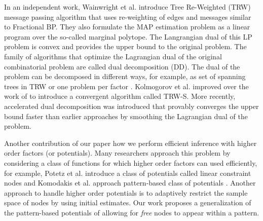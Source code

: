 \documentclass[letterpaper, 10 pt, conference]{ieeeconf} %
\begin{document}
In an 
independent work, Wainwright et al.  \cite{wainwright2005map} introduce Tree 
Re-Weighted (TRW) message passing algorithm that uses re-weighting of edges and 
messages similar to Fractional BP. They also formulate the MAP estimation 
problem as a linear program over the so-called marginal polytope.  The 
Langrangian dual of this LP problem is convex and provides the upper bound to 
the original problem. The family of algorithms that optimize the Lagrangian dual 
of the original combinatorial problem are called dual decomposition (DD). The 
dual of the problem can be decomposed in different ways, for example, as set of 
spanning trees in TRW \cite{wainwright2005map} or one problem per factor 
\cite{sontag2011introduction}. Kolmogorov et al.  \cite{kschischang2001factor} 
improved over the work of \cite{wainwright2005map} to introduce a convergent 
algorithm called TRW-S.  More recently, accelerated dual decomposition 
\cite{jojic2010accelerated} was introduced that provably converges the upper 
bound faster than earlier approaches by smoothing the Lagrangian dual of the 
problem. 

Another contribution of our paper how we perform efficient inference with 
higher order factors (or potentials). Many researchers approach this problem
by considering a class of functions for which higher order factors can used
efficiently, for example, Potetz et al. introduce a class of potentials called
linear constraint nodes \cite{potetz2007efficient} and Komodakis et al.
approach pattern-based class of potentials \cite{komodakis2009beyond}.
Another approach to handle higher order potentials
\cite{leonardis2006efficient}  is to adaptively restrict the sample space of
nodes by using initial estimates.   Our work proposes a generalization of the 
pattern-based potentials of \cite{komodakis2009beyond} allowing for 
\textit{free} nodes to appear within a pattern.
\end{document}
